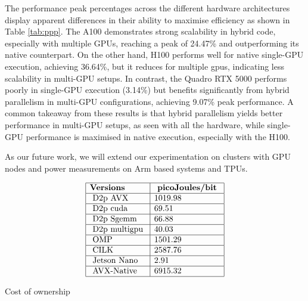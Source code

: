 The performance peak percentages across the different hardware architectures display apparent differences in their ability to maximise efficiency as shown in Table \ref{tab:ppp}. The A100 demonstrates strong scalability in hybrid code, especially with multiple GPUs, reaching a peak of 24.47\% and outperforming its native counterpart. On the other hand, H100  performs well for native single-GPU execution, achieving 36.64\%, but it reduces for multiple gpus, indicating less scalability in multi-GPU setups. In contrast, the Quadro RTX 5000 performs poorly in single-GPU execution (3.14\%) but benefits significantly from hybrid parallelism in multi-GPU configurations, achieving 9.07\% peak performance. A common takeaway from these results is that hybrid parallelism yields better performance in multi-GPU setups, as seen with all the hardware, while single-GPU performance is maximised in native execution, especially with the H100.

As our future work, we will extend our experimentation on clusters with GPU nodes and power measurements on Arm based systems and TPUs.
\begin{table}[htbp]
$$
\begin{array}{|l|l|}
\hline \text {\textbf{Versions}} & \textbf{ picoJoules/bit } \\
\hline \text { D2p AVX } & 1019.98 \\
\hline \text { D2p cuda } & 69.51 \\
\hline \text { D2p Sgemm } & 66.88 \\
\hline \text { D2p multigpu } & 40.03 \\
\hline \text { OMP } & 1501.29 \\
\hline \text { CILK } & 2587.76 \\
\hline \text { Jetson Nano} & 2.91 \\
\hline \text { AVX-Native} & 6915.32 \\
\hline
\end{array}
\vspace{-0.25cm}
$$
\caption{Cost of ownership}
\label{tab:co}
\end{table}


